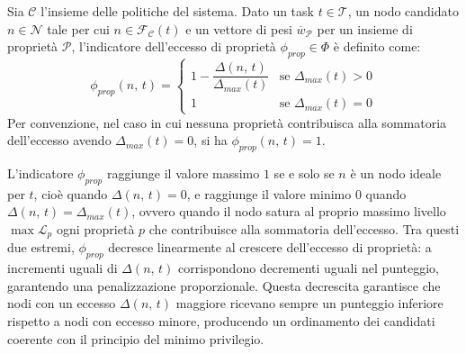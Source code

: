 \begin{optimizer}
    \label{def:indicatore_eccesso}
    Sia $\mathcal{C}$ l'insieme delle politiche del sistema. Dato un task $t \in \mathcal{T}$, un nodo candidato $n \in \mathcal{N}$ tale per cui $n \in \mathcal{F_C}(t)$ e un vettore di pesi $\overline{w}_{\mathcal{P}}$ per un insieme di proprietà $\mathcal{P}$, l'indicatore dell'eccesso di proprietà $\phi_{prop} \in \Phi$ è definito
    come:
    \begin{equation}
        \phi_{prop}(n,\, t) = 
        \begin{cases} 
            1 - \dfrac{\Delta(n,\, t)}{\Delta_{max}(t)} & \text{se } \Delta_{max}(t) > 0 \\[2ex]
            1 & \text{se } \Delta_{max}(t) = 0
       \end{cases}
    \end{equation}
    Per convenzione, nel caso in cui nessuna proprietà contribuisca alla sommatoria dell'eccesso avendo $\Delta_{max}(t) = 0$, si ha $\phi_{prop}(n,\, t) = 1$.
\end{optimizer}

L'indicatore $\phi_{prop}$ raggiunge il valore massimo $1$ se e solo se $n$ è un nodo ideale per $t$, cioè quando $\Delta(n,\, t) = 0$, e raggiunge il valore minimo $0$ quando $\Delta(n,\, t) = \Delta_{max}(t)$, ovvero quando il nodo satura al proprio massimo livello $\max \mathcal{L}_p$ ogni proprietà $p$ che contribuisce alla sommatoria dell'eccesso. Tra questi due estremi, $\phi_{prop}$ decresce linearmente al crescere dell'eccesso di proprietà: a incrementi uguali di $\Delta(n,\, t)$ corrispondono decrementi uguali nel punteggio, garantendo una penalizzazione proporzionale. Questa decrescita garantisce che nodi con un eccesso $\Delta(n,\, t)$ maggiore ricevano sempre un punteggio inferiore rispetto a nodi con eccesso minore, producendo un ordinamento dei candidati coerente con il principio del minimo privilegio. 

